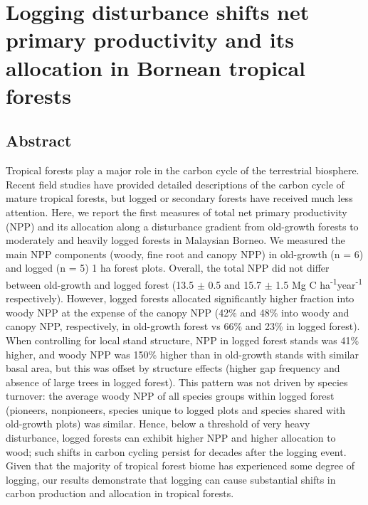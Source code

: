 \section*{Logging disturbance shifts net primary productivity and its allocation in Bornean tropical forests \citep{Riutta2018}}

\subsection*{Abstract}
Tropical forests play a major role in the carbon cycle of the terrestrial biosphere. Recent field studies have provided detailed descriptions of the carbon cycle of mature tropical forests, but logged or secondary forests have received much less attention. Here, we report the first measures of total net primary productivity (NPP) and its allocation along a disturbance gradient from old-growth forests to moderately and heavily logged forests in Malaysian Borneo. We measured the main NPP components (woody, fine root and canopy NPP) in old-growth (n = 6) and logged (n = 5) 1 ha forest plots. Overall, the total NPP did not differ between old-growth and logged forest (13.5 $\pm$ 0.5 and 15.7  $\pm$ 1.5 Mg C ha\textsuperscript{-1}year\textsuperscript{-1} respectively). However, logged forests allocated significantly higher fraction into woody NPP at the expense of the canopy NPP (42\% and 48\% into woody and canopy NPP, respectively, in old-growth forest vs 66\% and 23\% in logged forest). When controlling for local stand structure, NPP in logged forest stands was 41\% higher, and woody NPP was 150\% higher than in old-growth stands with similar basal area, but this was offset by structure effects (higher gap frequency and absence of large trees in logged forest). This pattern was not driven by species turnover: the average woody NPP of all species groups within logged forest (pioneers, nonpioneers, species unique to logged plots and species shared with old-growth plots) was similar. Hence, below a threshold of very heavy disturbance, logged forests can exhibit higher NPP and higher allocation to wood; such shifts in carbon cycling persist for decades after the logging event. Given that the majority of tropical forest biome has experienced some degree of logging, our results demonstrate that logging can cause substantial shifts in carbon production and allocation in tropical forests.

